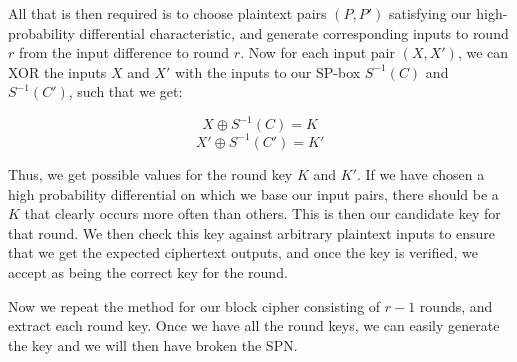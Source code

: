 All that is then required is to choose plaintext pairs $(P, P')$ satisfying our
high-probability differential characteristic, and generate corresponding inputs
to round $r$ from the input difference to round $r$.  Now for each input pair
$(X, X')$, we can XOR the inputs $X$ and $X'$ with the inputs to our SP-box
$S^{-1}(C)$ and $S^{-1}(C')$, such that we get:

\begin{equation}
X \oplus S^{-1}(C) = K
\end{equation}
\begin{equation}
X' \oplus S^{-1}(C') = K'
\end{equation}

Thus, we get possible values for the round key $K$ and $K'$. If we have chosen
a high probability differential on which we base our input pairs, there should
be a $K$ that clearly occurs more often than others. This is then our candidate
key for that round. We then check this key against arbitrary plaintext inputs
to ensure that we get the expected ciphertext outputs, and once the key is
verified, we accept as being the correct key for the round.

Now we repeat the method for our block cipher consisting of $r-1$ rounds, and
extract each round key. Once we have all the round keys, we can easily generate
the key and we will then have broken the SPN.
